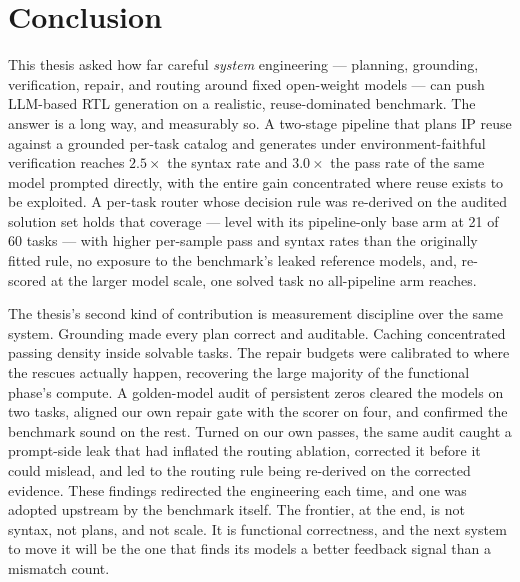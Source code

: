 \section{Conclusion}
\label{sec:conclusion}

This thesis asked how far careful \emph{system} engineering --- planning,
grounding, verification, repair, and routing around fixed open-weight
models --- can push LLM-based RTL generation on a realistic,
reuse-dominated benchmark. The answer is a long way, and measurably so.
A two-stage pipeline that plans IP reuse against a grounded per-task
catalog and generates under environment-faithful verification reaches
$2.5\times$ the syntax rate and $3.0\times$ the pass rate of the same
model prompted directly, with the entire gain concentrated where reuse
exists to be exploited. A per-task router whose decision rule was re-derived on the audited
solution set holds that coverage --- level with its pipeline-only base
arm at 21 of 60 tasks --- with higher per-sample pass and syntax rates
than the originally fitted rule, no exposure to the benchmark's leaked
reference models, and, re-scored at the larger model scale, one solved
task no all-pipeline arm reaches.

The thesis's second kind of contribution is measurement discipline over
the same system. Grounding made every plan correct and auditable.
Caching concentrated passing density inside solvable tasks. The repair
budgets were calibrated to where the rescues actually happen, recovering
the large majority of the functional phase's compute. A golden-model
audit of persistent zeros cleared the models on two tasks, aligned our
own repair gate with the scorer on four, and confirmed the benchmark
sound on the rest. Turned on our own passes, the same audit caught a
prompt-side leak that had inflated the routing ablation, corrected it
before it could mislead, and led to the routing rule being re-derived
on the corrected evidence. These findings redirected the engineering
each time, and one was adopted upstream by the benchmark itself. The
frontier, at the end, is not syntax, not plans, and not scale. It is
functional correctness, and the next system to move it will be the one
that finds its models a better feedback signal than a mismatch count.
